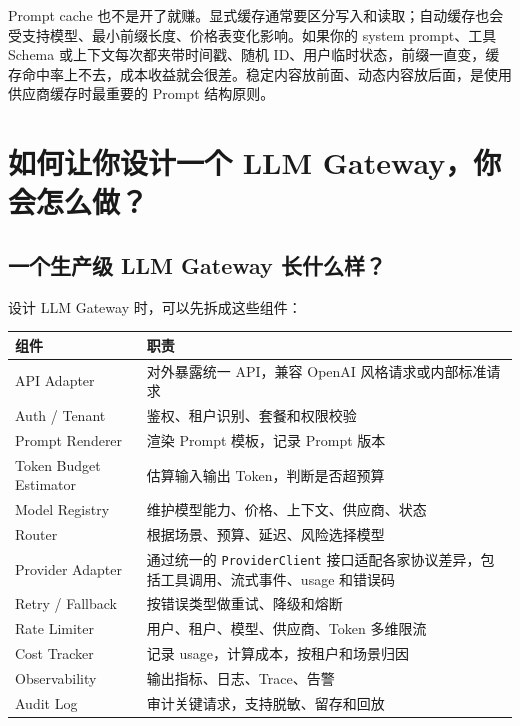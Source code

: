\documentclass[10pt,a4paper]{ctexart}
\begin{document}
Prompt cache 也不是开了就赚。显式缓存通常要区分写入和读取；自动缓存也会受支持模型、最小前缀长度、价格表变化影响。如果你的 system prompt、工具 Schema 或上下文每次都夹带时间戳、随机 ID、用户临时状态，前缀一直变，缓存命中率上不去，成本收益就会很差。稳定内容放前面、动态内容放后面，是使用供应商缓存时最重要的 Prompt 结构原则。



\section{如何让你设计一个 LLM Gateway，你会怎么做？}


\subsection{一个生产级 LLM Gateway 长什么样？}


设计 LLM Gateway 时，可以先拆成这些组件：


{\footnotesize
\begin{tabularx}{\textwidth}{|X|X|}
\hline
\textbf{组件} & \textbf{职责} \\
\hline
API Adapter & 对外暴露统一 API，兼容 OpenAI 风格请求或内部标准请求 \\
\hline
Auth / Tenant & 鉴权、租户识别、套餐和权限校验 \\
\hline
Prompt Renderer & 渲染 Prompt 模板，记录 Prompt 版本 \\
\hline
Token Budget Estimator & 估算输入输出 Token，判断是否超预算 \\
\hline
Model Registry & 维护模型能力、价格、上下文、供应商、状态 \\
\hline
Router & 根据场景、预算、延迟、风险选择模型 \\
\hline
Provider Adapter & 通过统一的 \texttt{ProviderClient} 接口适配各家协议差异，包括工具调用、流式事件、usage 和错误码 \\
\hline
Retry / Fallback & 按错误类型做重试、降级和熔断 \\
\hline
Rate Limiter & 用户、租户、模型、供应商、Token 多维限流 \\
\hline
Cost Tracker & 记录 usage，计算成本，按租户和场景归因 \\
\hline
Observability & 输出指标、日志、Trace、告警 \\
\hline
Audit Log & 审计关键请求，支持脱敏、留存和回放 \\
\hline
\end{tabularx}
}
\end{document}
